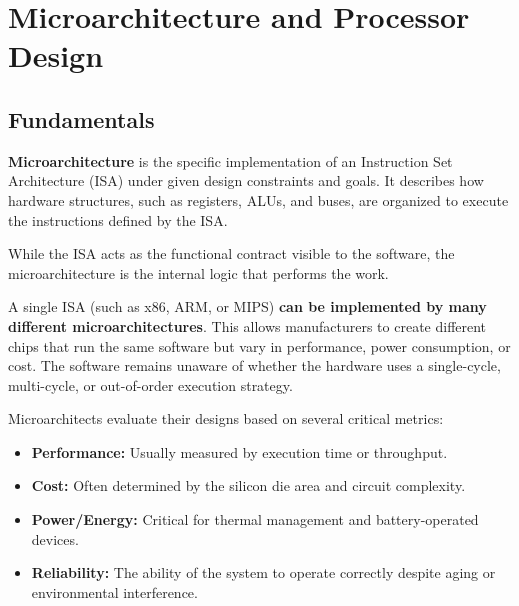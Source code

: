\section{Microarchitecture and Processor Design}

\subsection{Fundamentals}

\begin{definition}
\textbf{Microarchitecture} is the specific implementation of an Instruction Set Architecture (ISA) under given design constraints and goals. It describes how hardware structures, such as registers, ALUs, and buses, are organized to execute the instructions defined by the ISA.
\end{definition}

\begin{remark}
While the ISA acts as the functional contract visible to the software, the microarchitecture is the internal logic that performs the work.
\end{remark}

\begin{important}
A single ISA (such as x86, ARM, or MIPS) \textbf{can be implemented by many different microarchitectures}. This allows manufacturers to create different chips that run the same software but vary in performance, power consumption, or cost. The software remains unaware of whether the hardware uses a single-cycle, multi-cycle, or out-of-order execution strategy.
\end{important}

\begin{remark}
Microarchitects evaluate their designs based on several critical metrics:
\begin{itemize}
    \item \textbf{Performance:} Usually measured by execution time or throughput.
    \item \textbf{Cost:} Often determined by the silicon die area and circuit complexity.
    \item \textbf{Power/Energy:} Critical for thermal management and battery-operated devices.
    \item \textbf{Reliability:} The ability of the system to operate correctly despite aging or environmental interference.
\end{itemize}
\end{remark}

